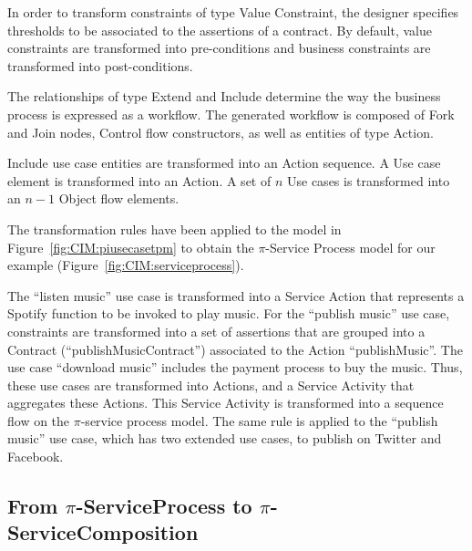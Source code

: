 \documentclass{singlecol-new}
\theoremstyle{TH}{
\newtheorem{lemma}{Lemma}
\newtheorem{theorem}[lemma]{Theorem}
\newtheorem{corrolary}[lemma]{Corrolary}
\newtheorem{conjecture}[lemma]{Conjecture}
\newtheorem{proposition}[lemma]{Proposition}
\newtheorem{claim}[lemma]{Claim}
\newtheorem{stheorem}[lemma]{Wrong Theorem}
\newtheorem{algorithm}{Algorithm}
}
\theoremstyle{THrm}{
\newtheorem{definition}{Definition}[section]
\newtheorem{question}{Question}[section]
\newtheorem{remark}{Remark}
\newtheorem{scheme}{Scheme}
}
\theoremstyle{THhit}{
\newtheorem{case}{Case}[section]
}
\theoremstyle{THhsl}{
\newtheorem{example}{Example}
}
\begin{document}
In order to transform constraints of type {\sf Value Constraint}, the designer specifies thresholds to be associated to the assertions of a contract.
By default, value constraints are transformed into pre-conditions and business constraints are transformed into post-conditions. 
  
The relationships of type  {\sc Extend} and {\sc Include}  determine the way the business process is expressed as a workflow.  
The generated workflow is composed of {\sf Fork} and {\sf Join} nodes,  {\sc Control flow} constructors, as well as entities of type {\sc Action}.

{\sf Include} use case entities are transformed into an {\sf Action} sequence.
A {\sc Use case} element is transformed into an {\sf Action}. 
A set of $n$ {\sc Use cases} is transformed into an  $n-1$ {\sf Object flow} elements. 
%

\begin{example}\label{ex:toPublicMusicT1} 
The transformation rules have been applied to the model in Figure~\ref{fig:CIM:piusecasetpm} to obtain the $\pi$-Service Process model for our example (Figure~\ref{fig:CIM:serviceprocess}).



The ``listen music'' use case is transformed into a Service Action that  represents a Spotify  function to be invoked to play music. 
For the ``publish music'' use case,  constraints are transformed into a set of assertions that are grouped into a Contract ({\sf ``publishMusicContract''}) associated to the Action {\sf ``publishMusic''}. 
The use case ``download music''  includes the payment process to buy the music. 
Thus, these use cases  are transformed into {\sf Actions}, and a {\sf Service Activity} that aggregates these {\sf Actions}.   
This \textsf{Service Activity} is transformed into a sequence flow on the $\pi$-service process model.
The same rule is applied to the ``publish music'' use case, which has two extended use cases, to publish on Twitter and Facebook.
 \end{example}

\subsection{From $\pi$-ServiceProcess to $\pi$-ServiceComposition}
\end{document}
